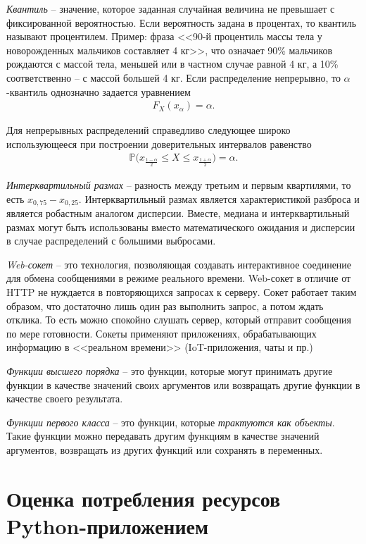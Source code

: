 \documentclass[%
	11pt,
	a4paper,
	utf8,
		]{article}
\begin{document}
\noindent\emph{Квантиль} -- значение, которое заданная случайная величина не превышает с фиксированной вероятностью. Если вероятность задана в процентах, то квантиль называют процентилем. Пример: фраза <<90-й процентиль массы тела у новорожденных мальчиков составляет 4 кг>>, что означает 90\% мальчиков рождаются с массой тела, меньшей или в частном случае равной 4 кг, а 10\% соответственно -- с массой большей 4 кг. Если распределение непрерывно, то $ \alpha $-квантиль однозначно задается уравнением
\begin{align*}
	F_X(x_\alpha) = \alpha.
\end{align*}

Для непрерывных распределений справедливо следующее широко использующееся при построении доверительных интервалов равенство
\begin{align*}
	\mathbb{P}\big(x_{\frac{1 - \alpha}{2}} \leqslant X \leqslant x_{\frac{1 + \alpha}{2}}\big) = \alpha.
\end{align*}

\noindent\emph{Интерквартильный размах} -- разность между третьим и первым квартилями, то есть $ x_{0,75} - x_{0,25} $. Интерквартильный размах является характеристикой разброса и является робастным аналогом дисперсии. Вместе, медиана и интерквартильный размах могут быть использованы вместо математического ожидания и дисперсии в случае распределений с большими выбросами.

\noindent\emph{Web-сокет} -- это технология, позволяющая создавать интерактивное соединение для обмена сообщениями в режиме реального времени. Web-сокет в отличие от HTTP не нуждается в повторяющихся запросах к серверу. Сокет работает таким образом, что достаточно лишь один раз выполнить запрос, а потом ждать отклика. То есть можно спокойно слушать сервер, который отправит сообщения по мере готовности. Сокеты применяют приложениях, обрабатывающих информацию в <<реальном времени>> (IoT-приложения, чаты и пр.)

\noindent\emph{Функции высшего порядка} -- это функции, которые могут принимать другие функции в качестве значений своих аргументов или возвращать другие функции в качестве своего результата.

\noindent\emph{Функции первого класса} -- это функции, которые \emph{трактуются как объекты}. Такие функции можно передавать другим функциям в качестве значений аргументов, возвращать из других функций или сохранять в переменных.

\section{Оценка потребления ресурсов Python-приложением}
\end{document}
